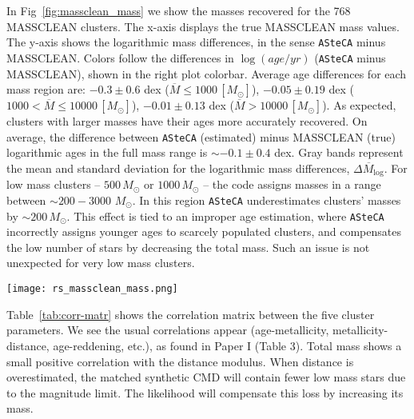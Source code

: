 \documentclass{aa}
\begin{document}
\begin{appendix}
In Fig~\ref{fig:massclean_mass} we show the masses recovered for the 768
MASSCLEAN clusters. The x-axis displays the true MASSCLEAN mass
values. The y-axis shows the logarithmic mass differences, in the sense \texttt
{ASteCA} minus MASSCLEAN.\@
%
Colors follow the differences in $\log(age/yr)$ (\texttt{ASteCA} minus
MASSCLEAN), shown in the right plot colorbar.
Average age differences for each mass region are: 
$-0.3{\pm}0.6$ dex ($\overline{M}{\le}1000\,[M_{\odot}]$),
$-0.05{\pm}0.19$ dex ($1000{<}\overline{M}{\le}10000\,[M_{\odot}]$),
$-0.01{\pm}0.13$ dex ($\overline{M}{>}10000\,[M_{\odot}]$).
As expected, clusters with larger masses have their ages more accurately
recovered. On average, the difference between \texttt{ASteCA} (estimated) minus
MASSCLEAN (true) logarithmic ages in the full mass range is ${\sim}-0.1{\pm}0.4$
dex.
%
Gray bands represent the mean and standard deviation for the logarithmic
mass differences, $\overline{\Delta M_{\log}}$.
%
For low mass clusters -- $500\,M_{\odot}$ or $1000\,M_{\odot}$ -- the
code assigns masses in a range between ${\sim}200{-}3000$ $M_{\odot}$.
In this region \texttt{ASteCA} underestimates clusters' masses by
${\sim}200\,M_{\odot}$. This effect is tied to an improper age estimation, where
\texttt{ASteCA} incorrectly assigns younger ages to scarcely populated clusters,
and compensates the low number of stars by decreasing the total mass. Such an
issue is not unexpected for very low mass clusters.

\begin{figure*}
\texttt{[image: rs\_massclean\_mass.png]}
\caption{Recovered masses by \texttt{ASteCA} for the 768 MASSCLEAN clusters.
Logarithmic mass differences $\Delta M_{\log}$ are obtained in the sense
\texttt{ASteCA} minus MASSCLEAN, and shown in the y-axis. MASSCLEAN masses in
the x-axis are perturbed with a small random scatter.}
\label{fig:massclean_mass}
\end{figure*}

Table~\ref{tab:corr-matr} shows the correlation matrix between the five cluster
parameters. We see the usual correlations appear (age-metallicity,
metallicity-distance, age-reddening, etc.), as found in Paper I (Table 3).
Total mass shows a small positive correlation with the distance modulus.
When distance is overestimated, the matched synthetic CMD will contain fewer low
mass stars due to the magnitude limit. The likelihood will compensate this loss
by increasing its mass.


\end{appendix}
\end{document}

